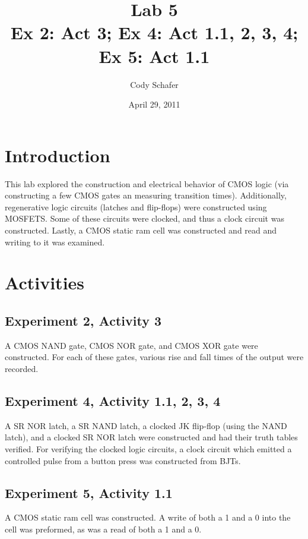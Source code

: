 \documentclass[10pt]{article}
\title{\textbf{Lab 5} \\
Ex 2: Act 3; Ex 4: Act 1.1, 2, 3, 4; Ex 5: Act 1.1}
\author{Cody Schafer}
\date{April 29, 2011}
\begin{document}
\maketitle

\section{Introduction}

This lab explored the construction and electrical behavior of CMOS logic
(via constructing a few CMOS gates an measuring transition times).
Additionally, regenerative logic circuits (latches and flip-flops) 
were constructed using MOSFETS. Some of these circuits were clocked, and
thus a clock circuit was constructed. Lastly, a CMOS static ram cell was
constructed and read and writing to it was examined.


\section{Activities}

\subsection{Experiment 2, Activity 3}

A CMOS NAND gate, CMOS NOR gate, and CMOS XOR gate were constructed. For
each of these gates, various rise and fall times of the output were
recorded.

\subsection{Experiment 4, Activity 1.1, 2, 3, 4}

A SR NOR latch, a SR NAND latch, a clocked JK flip-flop (using the NAND
latch), and a clocked SR NOR latch were constructed and had their truth
tables verified. For verifying the clocked logic circuits, a clock circuit
which emitted a controlled pulse from a button press was constructed from
BJTs.

\subsection{Experiment 5, Activity 1.1}

A CMOS static ram cell was constructed. A write of both a 1 and a 0 into
the cell was preformed, as was a read of both a 1 and a 0.
\end{document}
